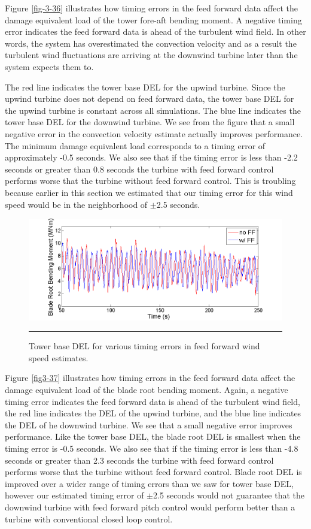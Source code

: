Figure \ref{fig-3-36} illustrates how timing errors in the feed forward data affect the damage equivalent load of the tower fore-aft bending moment. A negative timing error indicates the feed forward data is ahead of the turbulent wind field. In other words, the system has overestimated the convection velocity and as a result the turbulent wind fluctuations are arriving at the downwind turbine later than the system expects them to. 

The red line indicates the tower base DEL for the upwind turbine. Since the upwind turbine does not depend on feed forward data, the tower base DEL for the upwind turbine is constant across all simulations. The blue line indicates the tower base DEL for the downwind turbine. We see from the figure that a small negative error in the convection velocity estimate actually improves performance. The minimum damage equivalent load corresponds to a timing error of approximately -0.5 seconds. We also see that if the timing error is less than -2.2 seconds or greater than 0.8 seconds the turbine with feed forward control performs worse that the turbine without feed forward control. This is troubling because earlier in this section we estimated that our timing error for this wind speed would be in the neighborhood of $\pm$2.5 seconds.

\begin{figure}[htbp]
	\centering
		\includegraphics[trim = {1cm 0 2cm 0}, clip, width = \linewidth]{Figures/ch3Figures/fig3-35.png}
		\rule{35em}{0.5pt}
	\caption{Tower base DEL for various timing errors in feed forward wind speed estimates.}
	\label{fig3-36}
\end{figure}

Figure \ref{fig3-37} illustrates how timing errors in the feed forward data affect the damage equivalent load of the blade root bending moment. Again, a negative timing error indicates the feed forward data is ahead of the turbulent wind field, the red line indicates the DEL of the upwind turbine, and the blue line indicates the DEL of he downwind turbine. We see that a small negative error improves performance. Like the tower base DEL, the blade root DEL is smallest when the timing error is -0.5 seconds. We also see that if the timing error is less than -4.8 seconds or greater than 2.3 seconds the turbine with feed forward control performs worse that the turbine without feed forward control. Blade root DEL is improved over a wider range of timing errors than we saw for tower base DEL, however our estimated timing error of $\pm$2.5 seconds would not guarantee that the downwind turbine with feed forward pitch control would perform better than a turbine with conventional closed loop control.


